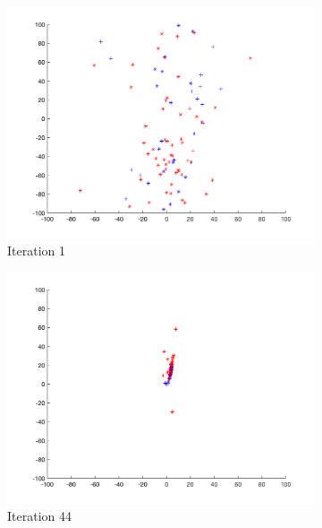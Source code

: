 \begin{figure}
  \begin{subfigure}[b]{0.4\textwidth}
    \includegraphics[width=\textwidth]{img/smpl/rosn2d-9-100/loa-iter-1}
    \caption{Iteration 1}
    \label{fig:s6-iter-0}
  \end{subfigure}
  \begin{subfigure}[b]{0.4\textwidth}
    \includegraphics[width=\textwidth]{img/smpl/rosn2d-9-100/loa-iter-44}
    \caption{Iteration 44}
    \label{fig:s6-iter-1}
  \end{subfigure}
  \begin{subfigure}[b]{0.4\textwidth}

\end{subfigure}
\end{figure}
